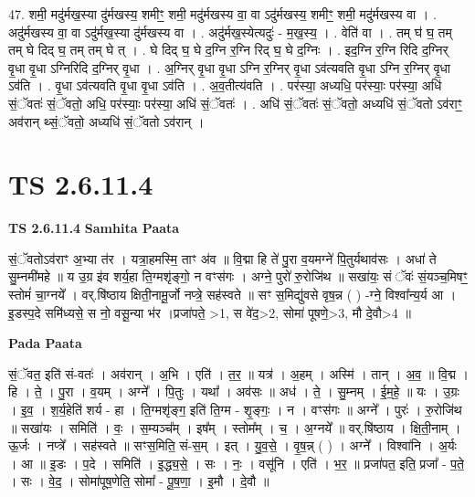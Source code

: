 \documentclass[17pt]{extarticle}
\begin{document}
47. शमी॒ मदु॑र्मख॒स्या दु॑र्मखस्य॒ शमीꣳ॒॒ शमी॒ मदु॑र्मखस्य वा॒ वा ऽदु॑र्मखस्य॒ शमीꣳ॒॒ शमी॒ मदु॑र्मखस्य वा । . अदु॑र्मखस्य वा॒ वा ऽदु॑र्मख॒स्या दु॑र्मखस्य वा । . अदु॑र्मख॒स्येत्यदुः॑ - म॒ख॒स्य॒ । . वेति॑ वा । . तम् घ॑ घ॒ तम् तम् घे दिद् घ॒ तम् तम् घे त् । . घे दिद् घ॒ घे द॒ग्नि र॒ग्नि रिद् घ॒ घे द॒ग्निः । . इद॒ग्नि र॒ग्नि रिदि द॒ग्निर् वृ॒धा वृ॒धा ऽग्निरिदि द॒ग्निर् वृ॒धा । . अ॒ग्निर् वृ॒धा वृ॒धा ऽग्नि र॒ग्निर् वृ॒धा ऽव॑त्यवति वृ॒धा ऽग्नि र॒ग्निर् वृ॒धा ऽव॑ति । . वृ॒धा ऽव॑त्यवति वृ॒धा वृ॒धा ऽव॑ति । . अ॒व॒तीत्य॑वति । . पर॑स्या॒ अध्यधि॒ पर॑स्याः॒ पर॑स्या॒ अधि॑ सं॒ॅवतः॑ सं॒ॅवतो॒ अधि॒ पर॑स्याः॒ पर॑स्या॒ अधि॑ सं॒ॅवतः॑ । . अधि॑ सं॒ॅवतः॑ सं॒ॅवतो॒ अध्यधि॑ सं॒ॅवतो ऽव॑राꣳ॒॒ अव॑रान् थ्सं॒ॅवतो॒ अध्यधि॑ सं॒ॅवतो ऽव॑रान् । \newline
\pagebreak
{}

\section{ TS 2.6.11.4 }

\textbf{TS 2.6.11.4 } \newline
\textbf{Samhita Paata} \newline

सं॒ॅवतोऽव॑राꣳ अ॒भ्या त॑र । यत्रा॒हमस्मि॒ ताꣳ अ॑व ॥ वि॒द्मा हि ते॑ पु॒रा व॒यमग्ने॑ पि॒तुर्यथाव॑सः । अधा॑ ते सु॒म्नमी॑महे ॥ य उ॒ग्र इ॑व शर्य॒हा ति॒ग्मशृ॑ङ्गो॒ न वꣳस॑गः । अग्ने॒ पुरो॑ रु॒रोजि॑थ ॥ सखा॑यः॒ सं ॅवः॑ सं॒यञ्च॒मिषꣳ॒॒ स्तोमं॑ चा॒ग्नये᳚ । वर्.षि॑ष्ठाय क्षिती॒नामू॒र्जो नप्त्रे॒ सह॑स्वते ॥ सꣳ स॒मिद्यु॑वसे वृष॒न्न ( ) -ग्ने॒ विश्वा᳚न्य॒र्य आ । इ॒डस्प॒दे समि॑ध्यसे॒ स नो॒ वसू॒न्या भ॑र ।प्रजा॑पते॒ >1, स वे॑द॒>2, सोमा॑ पूषणे॒>3, मौ दे॒वौ>4 ॥ \newline

\textbf{Pada Paata} \newline

सं॒ॅवत॒ इति॑ सं-वतः॑ । अव॑रान् । अ॒भि । एति॑ । त॒र॒ ॥ यत्र॑ । अ॒हम् । अस्मि॑ । तान् । अ॒व॒ ॥ वि॒द्म । हि । ते॒ । पु॒रा । व॒यम् । अग्ने᳚ । पि॒तुः । यथा᳚ । अव॑सः ॥ अध॑ । ते॒ । सु॒म्नम् । ई॒म॒हे॒ ॥ यः । उ॒ग्रः । इ॒व॒ । श॒र्य॒हेति॑ शर्य - हा । ति॒ग्मशृ॑ङ्ग॒ इति॑ ति॒ग्म - शृ॒ङ्गः॒ । न । वꣳस॑गः ॥ अग्ने᳚ । पुरः॑ । रु॒रोजि॑थ ॥ सखा॑यः । समिति॑ । वः॒ । स॒म्यञ्च᳚म् । इष᳚म् । स्तोम᳚म् । च॒ । अ॒ग्नये᳚ ॥ वर्.षि॑ष्ठाय । क्षि॒ती॒नाम् । ऊ॒र्जः । नप्त्रे᳚ । सह॑स्वते ॥ सꣳस॒मिति॒ सं-स॒म् । इत् । यु॒व॒से॒ । वृ॒ष॒न्न् ( ) । अग्ने᳚ । विश्वा॑नि । अ॒र्यः । आ ॥ इ॒डः । प॒दे । समिति॑ । इ॒द्ध्य॒से॒ । सः । नः॒ । वसू॑नि । एति॑ । भ॒र॒ ॥ प्रजा॑पत॒ इति॒ प्रजा᳚ - प॒ते॒ । सः । वे॒द॒ । सोमा॑पूष॒णेति॒ सोमा᳚ - पू॒ष॒णा॒ । इ॒मौ । दे॒वौ ॥  \newline
\end{document}
